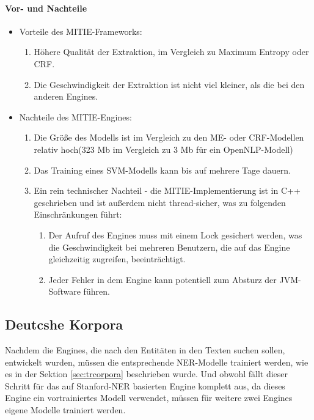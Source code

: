 \paragraph{Vor- und Nachteile}
\begin{itemize}
\item Vorteile des MITIE-Frameworks:
\begin{enumerate}
\item Höhere Qualität der Extraktion, im Vergleich zu Maximum Entropy oder CRF.
\item Die Geschwindigkeit der Extraktion ist nicht viel kleiner, als die bei den anderen Engines.
\end{enumerate}
\item Nachteile des MITIE-Engines:
\begin{enumerate}
\item Die Größe des Modells ist im Vergleich zu den ME- oder CRF-Modellen relativ hoch(323 Mb im Vergleich zu 3 Mb für ein OpenNLP-Modell)
\item Das Training eines SVM-Modells kann bis auf mehrere Tage dauern.
\item Ein rein technischer Nachteil - die MITIE-Implementierung ist in C++ geschrieben und ist außerdem nicht thread-sicher, was zu folgenden Einschränkungen führt:
\begin{enumerate}
\item Der Aufruf des Engines muss mit einem Lock gesichert werden, was die Geschwindigkeit bei mehreren Benutzern, die auf das Engine gleichzeitig zugreifen, beeinträchtigt.
\item Jeder Fehler in dem Engine kann potentiell zum Absturz der JVM-Software führen.
\end{enumerate}
\end{enumerate}
\end{itemize}

\subsection{Deutcshe Korpora} \label{subsec:decor}
Nachdem die Engines, die nach den Entitäten in den Texten suchen sollen, entwickelt wurden, müssen die entsprechende NER-Modelle trainiert werden, wie es in der Sektion \ref{sec:trcorpora} beschrieben wurde. Und obwohl fällt dieser Schritt für das auf Stanford-NER basierten Engine komplett aus, da dieses Engine ein vortrainiertes Modell verwendet, müssen für weitere zwei Engines eigene Modelle trainiert werden.

